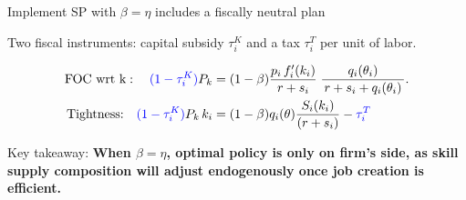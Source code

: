 \documentclass[9pt,xcolor={svgnames}]{beamer}
\begin{document}
\begin{frame}{Implement SP with $\beta=\eta$ includes a fiscally neutral plan}

Two fiscal instruments:  capital subsidy $\tau^K_i$ and a tax  $\tau^T_i$ per unit of labor. 

\begin{align*}
\text{FOC wrt k}: \quad \textcolor{blue}{ (1-\tau^K_i)}    P_k & =  (1-\beta)\frac{p_i\,f_i'(k_i)}{r+s_i}\;
   \frac{q_i(\theta_i)}{\,r+s_i + q_i(\theta_i)\,}.\\
 \text{Tightness:} \quad \textcolor{blue}{ (1-\tau^K_i)}       P_{k}\,k_i  &=  (1-\beta) q_i(\theta) \frac{S_i(k_i)}{(r+s_i)}  - \textcolor{blue}{\tau^T_i}
\end{align*}

\begin{center}
\end{center}


Key takeaway: \textbf{When $\beta=\eta$, optimal policy is only on firm's side,  as skill supply composition will adjust endogenously once job creation is efficient.}




    
\end{frame}
\end{document}
